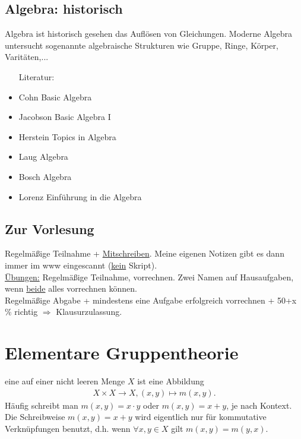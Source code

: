 \subsection*{Algebra: historisch}
Algebra ist historisch gesehen das Auflösen von Gleichungen.
Moderne Algebra untersucht sogenannte algebraische Strukturen wie Gruppe, Ringe, Körper, Varitäten,...

\begin{itemize}
	\item[Literatur:]
	\item Cohn Basic Algebra
	\item Jacobson Basic Algebra I
	\item Herstein Topics in Algebra
	\item Laug Algebra
	\item Bosch Algebra
	\item Lorenz Einführung in die Algebra
\end{itemize}

\subsection*{Zur Vorlesung}
Regelmäßige Teilnahme + \uline{Mitschreiben}.
Meine eigenen Notizen gibt es dann immer im www eingescannt (\uline{kein} Skript).\\
\uline{Übungen:} Regelmäßige Teilnahme, vorrechnen.
Zwei Namen auf Hausaufgaben, wenn \uline{beide} alles vorrechnen können.\\
Regelmäßige Abgabe + mindestens eine Aufgabe erfolgreich vorrechnen + 50+x \% richtig $\Rightarrow$ Klausurzulassung.


\cleardoubleoddemptypage

\setcounter{page}{1}

\section{Elementare Gruppentheorie}
\label{sec:elementare_gruppentheorie}

 eine  auf einer nicht leeren Menge $X$ ist eine Abbildung
\begin{equation*}
\begin{aligned}
X\times X \to X , (x,y) \mapsto m(x,y).
\end{aligned}
\end{equation*}
Häufig schreibt man $m(x,y)= x\cdot y$ oder $ m(x,y) = x + y$, je nach Kontext. 
Die Schreibweise $m(x,y)=x+y$ wird eigentlich nur für kommutative Verknüpfungen benutzt, d.h. wenn $\forall x,y\in X$ gilt $m(x,y)=m(y,x)$.

